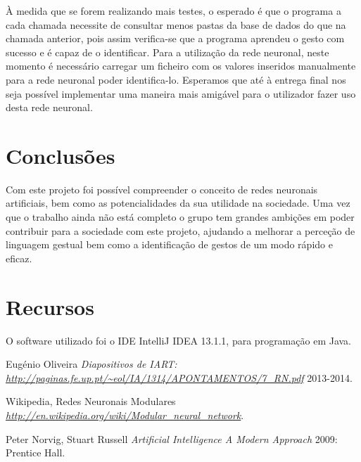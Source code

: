 \documentclass[10pt,a4paper]{article}
\begin{document}
À medida que se forem realizando mais testes, o esperado é que o programa a cada chamada necessite de consultar menos pastas da base de dados do que na chamada anterior, pois assim verifica-se que a programa aprendeu o gesto com sucesso e é capaz de o identificar.
Para a utilização da rede neuronal, neste momento é necessário carregar um ficheiro com os valores inseridos manualmente para a rede neuronal poder identifica-lo. Esperamos que até à entrega final nos seja possível implementar uma maneira mais amigável para o utilizador fazer uso desta rede neuronal.

\section{Conclusões}
\subitem

Com este projeto foi possível compreender o conceito de redes neuronais artificiais, bem como as potencialidades da sua utilidade na sociedade. Uma vez que o trabalho ainda não está completo o grupo tem grandes ambições em poder contribuir para a sociedade com este projeto, ajudando a melhorar a perceção de linguagem gestual bem como a identificação de gestos de um modo rápido e eficaz.

\section{Recursos}

O software utilizado foi o IDE IntelliJ IDEA 13.1.1, para programação em Java.


 \begin{thebibliography}{1}

   Eugénio Oliveira {\em Diapositivos de IART: {\url{http://paginas.fe.up.pt/~eol/IA/1314/APONTAMENTOS/7_RN.pdf}}}  2013-2014.
  
   Wikipedia, Redes Neuronais Modulares {\em\url{http://en.wikipedia.org/wiki/Modular_neural_network}}.

   Peter Norvig, Stuart Russell {\em Artificial Intelligence A Modern Approach } 2009: Prentice Hall.
  \end{thebibliography}
  \printindex
\end{document}
